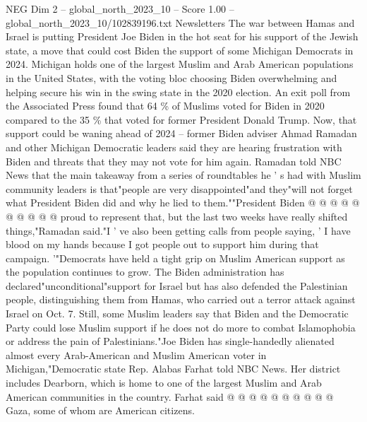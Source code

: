 \begin{textsample}{NEG Dim 2 – global\_north\_2023\_10 – Score 1.00 – global\_north\_2023\_10/102839196.txt}  \label{ex:f2_neg_297}
Newsletters The war between Hamas and Israel is putting President Joe Biden in the hot seat for his support of the Jewish state, a move that could cost Biden the support of some Michigan Democrats in 2024.
Michigan holds one of the largest Muslim and Arab American populations in the United States, with the voting bloc choosing Biden overwhelming and helping secure his win in the swing state in the 2020 election.
An exit poll from the Associated Press found that 64 \% of Muslims voted for Biden in 2020 compared to the 35 \% that voted for former President Donald Trump.
Now, that support could be waning ahead of 2024 -- former Biden adviser Ahmad Ramadan and other Michigan Democratic leaders said they are hearing frustration with Biden and threats that they may not vote for him again.
Ramadan told NBC News that the main takeaway from a series of roundtables he ' s had with Muslim community leaders is that"people are very disappointed"and they"will not forget what President Biden did and why he lied to them.""President Biden @ @ @ @ @ @ @ @ @ @ proud to represent that, but the last two weeks have really shifted things,"Ramadan said."I ' ve also been getting calls from people saying, ' I have blood on my hands because I got people out to support him during that campaign. '"Democrats have held a tight grip on Muslim American support as the population continues to grow.
The Biden administration has declared"unconditional"support for Israel but has also defended the Palestinian people, distinguishing them from Hamas, who carried out a terror attack against Israel on Oct. 7.
Still, some Muslim leaders say that Biden and the Democratic Party could lose Muslim support if he does not do more to combat Islamophobia or address the pain of Palestinians."Joe Biden has single-handedly alienated almost every Arab-American and Muslim American voter in Michigan,"Democratic state Rep.
Alabas Farhat told NBC News.
Her district includes Dearborn, which is home to one of the largest Muslim and Arab American communities in the country.
Farhat said @ @ @ @ @ @ @ @ @ @ Gaza, some of whom are American citizens.

\end{textsample}
